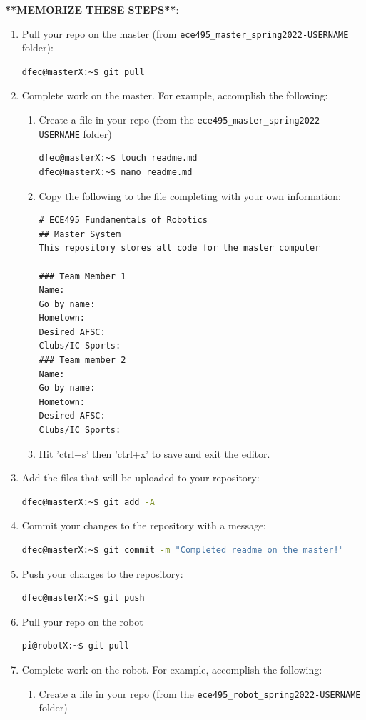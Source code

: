 \documentclass{handout}
\begin{document}
\textbf{**MEMORIZE THESE STEPS**}:
\begin{enumerate}
	\item Pull your repo on the master (from \texttt{ece495\_master\_spring2022-USERNAME} folder):
\begin{lstlisting}[language=bash]
dfec@masterX:~$ git pull
\end{lstlisting}
	\item Complete work on the master. For example, accomplish the following:
	\begin{enumerate}
		\item Create a file in your repo (from the \texttt{ece495\_master\_spring2022-USERNAME} folder)

\begin{lstlisting}[language=bash]
dfec@masterX:~$ touch readme.md
dfec@masterX:~$ nano readme.md	
\end{lstlisting}

\item Copy the following to the file completing with your own information:
\begin{lstlisting}
# ECE495 Fundamentals of Robotics
## Master System
This repository stores all code for the master computer

### Team Member 1
Name:
Go by name:
Hometown:
Desired AFSC:
Clubs/IC Sports:
### Team member 2
Name:
Go by name:
Hometown:
Desired AFSC:
Clubs/IC Sports:
\end{lstlisting}
\item Hit 'ctrl+s' then 'ctrl+x' to save and exit the editor.
	\end{enumerate}
	\item Add the files that will be uploaded to your repository:
\begin{lstlisting}[language=bash]
dfec@masterX:~$ git add -A
\end{lstlisting}
	\item Commit your changes to the repository with a message:
\begin{lstlisting}[language=bash]
dfec@masterX:~$ git commit -m "Completed readme on the master!"
\end{lstlisting}
	\item Push your changes to the repository:
\begin{lstlisting}[language=bash]
dfec@masterX:~$ git push
\end{lstlisting}
	\item Pull your repo on the robot
\begin{lstlisting}[language=bash]
pi@robotX:~$ git pull
\end{lstlisting}
		\item Complete work on the robot. For example, accomplish the following:
	\begin{enumerate}
		\item Create a file in your repo (from the \texttt{ece495\_robot\_spring2022-USERNAME} folder)
		

\end{enumerate}
\end{enumerate}
\end{document}
